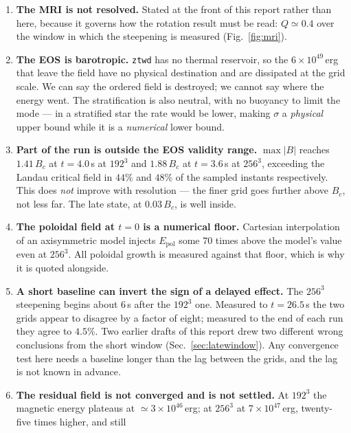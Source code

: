 \documentclass[11pt,a4paper]{article}
\newcommand{\Epol}{E_{\mathrm{pol}}}
\begin{document}
\begin{enumerate}\itemsep2pt
\item \textbf{The MRI is not resolved.} Stated at the front of this report
      rather than here, because it governs how the rotation result must be
      read: $Q \simeq 0.4$ over the window in which the steepening is measured
      (Fig.~\ref{fig:mri}).
\item \textbf{The EOS is barotropic.} \texttt{ztwd} has no thermal reservoir, so
      the $6\times10^{49}$\,erg that leave the field have no physical
      destination and are dissipated at the grid scale. We can say the ordered
      field is destroyed; we cannot say where the energy went. The
      stratification is also neutral, with no buoyancy to limit the mode --- in
      a stratified star the rate would be lower, making $\sigma$ a
      \emph{physical} upper bound while it is a \emph{numerical} lower bound.
\item \textbf{Part of the run is outside the EOS validity range.} $\max|B|$
      reaches $1.41\,B_c$ at $t = 4.0$\,s at $192^3$ and $1.88\,B_c$ at
      $t = 3.6$\,s at $256^3$, exceeding the Landau critical field in $44\%$ and
      $48\%$ of the sampled instants respectively. This does \emph{not} improve
      with resolution --- the finer grid goes further above $B_c$, not less far.
      The late state, at $0.03\,B_c$, is well inside.
\item \textbf{The poloidal field at $t=0$ is a numerical floor.} Cartesian
      interpolation of an axisymmetric model injects $\Epol$ some $70$ times
      above the model's value even at $256^3$. All poloidal growth is measured
      against that floor, which is why it is quoted alongside.
\item \textbf{A short baseline can invert the sign of a delayed effect.} The
      $256^3$ steepening begins about $6$\,s after the $192^3$ one. Measured to
      $t = 26.5$\,s the two grids appear to disagree by a factor of eight;
      measured to the end of each run they agree to $4.5\%$. Two earlier drafts of this
      report drew two different wrong conclusions from the short window
      (Sec.~\ref{sec:latewindow}). Any convergence test here needs a baseline
      longer than the lag between the grids, and the lag is not known in
      advance.
\item \textbf{The residual field is not converged and is not settled.} At
      $192^3$ the magnetic energy plateaus at $\simeq 3\times10^{46}$\,erg; at
      $256^3$ at $7\times10^{47}$\,erg, twenty-five times higher, and still

\end{enumerate}
\end{document}
